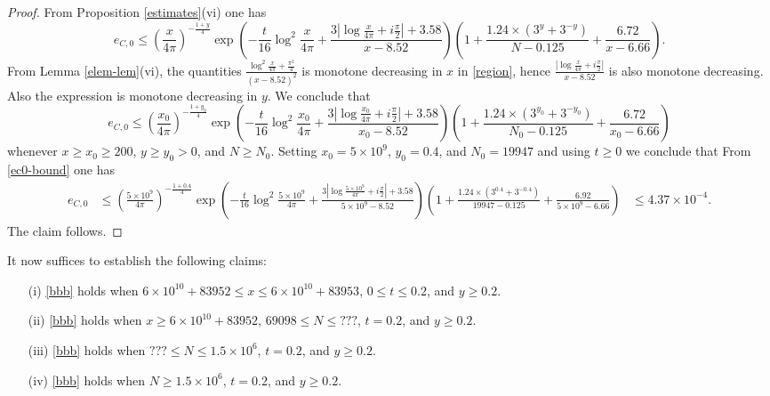 \begin{proof}
From Proposition \ref{estimates}(vi) one has
$$ e_{C,0} \leq \left(\frac{x}{4\pi}\right)^{-\frac{1+y}{4}} \exp\left( - \frac{t}{16} \log^2 \frac{x}{4\pi} + \frac{3 |\log \frac{x}{4\pi} + i \frac{\pi}{2}|+3.58}{x-8.52} \right) \left(1 + \frac{1.24 \times (3^y+3^{-y})}{N-0.125} + \frac{6.72}{x-6.66}\right).$$
From Lemma \ref{elem-lem}(vi), the quantities $\frac{\log^2 \frac{x}{4\pi} + \frac{\pi^2}{4}}{(x-8.52)^2}$ is monotone decreasing in $x$ in \eqref{region}, hence $\frac{|\log \frac{x}{4\pi} + i \frac{\pi}{2}|}{x-8.52}$ is also monotone decreasing.  Also the expression is monotone decreasing in $y$. We conclude that
\begin{equation}\label{ec0-bound}
 e_{C,0} \leq \left(\frac{x_0}{4\pi}\right)^{-\frac{1+y_0}{4}} \exp\left( - \frac{t}{16} \log^2 \frac{x_0}{4\pi} + \frac{3 |\log \frac{x_0}{4\pi} + i \frac{\pi}{2}|+3.58}{x_0-8.52} \right) \left(1 + \frac{1.24 \times (3^{y_0}+3^{-y_0})}{N_0-0.125} + \frac{6.72}{x_0-6.66}\right)
\end{equation}
whenever $x \geq x_0 \geq 200$, $y \geq y_0 > 0$, and $N \geq N_0$.  Setting $x_0 = 5 \times 10^9$, $y_0 = 0.4$, and $N_0 = 19947$ and using $t \geq 0$ we conclude that
From \eqref{ec0-bound} one has
\begin{align*}
e_{C,0} &\leq \left(\frac{5 \times 10^9}{4\pi}\right)^{-\frac{1+0.4}{4}} \exp\left( - \frac{t}{16} \log^2 \frac{5 \times 10^9}{4\pi} + \frac{3 |\log \frac{5 \times 10^9}{4\pi} + i \frac{\pi}{2}|+3.58}{5 \times 10^9-8.52} \right) \left(1 + \frac{1.24 \times (3^{0.4}+3^{-0.4})}{19947-0.125} + \frac{6.92}{5 \times 10^9-6.66}\right)
&\leq 4.37 \times 10^{-4}.
\end{align*}
The claim follows.
\end{proof}


It now suffices to establish the following claims:

\begin{itemize}
\item[(i)]  \eqref{bbb} holds when $6 \times 10^{10} + 83952 \leq x \leq 6 \times 10^{10} + 83953$, $0 \leq t \leq 0.2$, and $y \geq 0.2$.
\item[(ii)]  \eqref{bbb} holds when $x \geq 6 \times 10^{10} + 83952$, $69098 \leq N \leq ???$, $t = 0.2$, and $y \geq 0.2$.
\item[(iii)]  \eqref{bbb} holds when $??? \leq N \leq 1.5 \times 10^6$, $t = 0.2$, and $y \geq 0.2$.
\item[(iv)]  \eqref{bbb} holds when $N \geq 1.5 \times 10^6$, $t = 0.2$, and $y \geq 0.2$.
\end{itemize}


